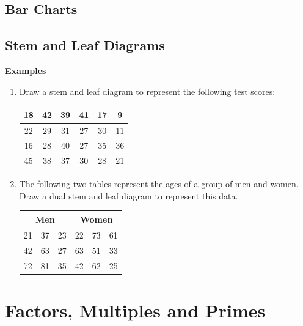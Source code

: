 \documentclass{article}
\begin{document}
\subsection{Bar Charts}

\newpage
\subsection{Stem and Leaf Diagrams}

\textbf{Examples}

\begin{enumerate}
    \item Draw a stem and leaf diagram to represent the following test scores:
    \begin{table}[h]
        \centering
        \begin{tabular}{|c|c|c|c|c|c|}
            \hline
            18 & 42 & 39 & 41 & 17 & 9 \\
            \hline
            22 & 29 & 31 & 27 & 30 & 11 \\
            \hline
            16 & 28 & 40 & 27 & 35 & 36 \\
            \hline
            45 & 38 & 37 & 30 & 28 & 21 \\
            \hline
        \end{tabular}
        \label{tab:my_label}
    \end{table}
    \vspace{50mm}
    \item The following two tables represent the ages of a group of men and women. Draw a dual stem and leaf diagram to represent this data.
    \begin{table}[h]
        \centering
        \begin{tabular}{|c|c|c||c|c|c|}
        \hline
            \multicolumn{3}{|c||}{Men} & \multicolumn{3}{c|}{Women} \\
            \hline
             21 & 37 & 23 & 22 & 73 & 61 \\
             \hline
             42 & 63 & 27 & 63 & 51 & 33 \\
             \hline
             72 & 81 & 35 & 42 & 62 & 25 \\
             \hline
        \end{tabular}
        \label{tab:my_label}
    \end{table}
\end{enumerate}



\newpage
\section*{Factors, Multiples and Primes}
\end{document}

